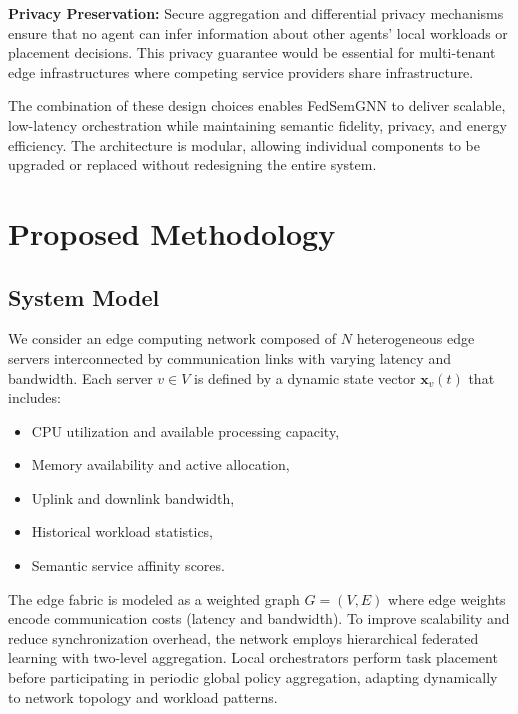 \documentclass[conference]{IEEEtran}
\begin{document}
	\textbf{Privacy Preservation:} Secure aggregation and differential privacy mechanisms ensure that no agent can infer information about other agents' local workloads or placement decisions. This privacy guarantee would be essential for multi-tenant edge infrastructures where competing service providers share infrastructure.
	
	The combination of these design choices enables FedSemGNN to deliver scalable, low-latency orchestration while maintaining semantic fidelity, privacy, and energy efficiency. The architecture is modular, allowing individual components to be upgraded or replaced without redesigning the entire system.
	
	
	\section{Proposed Methodology}
	\label{sec:methodology}
	
	\subsection{System Model}
	We consider an edge computing network composed of $N$ heterogeneous edge servers interconnected by communication links with varying latency and bandwidth. Each server $v \in V$ is defined by a dynamic state vector $\mathbf{x}_v(t)$ that includes:
	\begin{itemize}
		\item CPU utilization and available processing capacity,
		\item Memory availability and active allocation,
		\item Uplink and downlink bandwidth,
		\item Historical workload statistics,
		\item Semantic service affinity scores.
	\end{itemize}
	
	The edge fabric is modeled as a weighted graph $G = (V, E)$ where edge weights encode communication costs (latency and bandwidth). To improve scalability and reduce synchronization overhead, the network employs hierarchical federated learning with two-level aggregation. Local orchestrators perform task placement before participating in periodic global policy aggregation, adapting dynamically to network topology and workload patterns.
	
\end{document}
